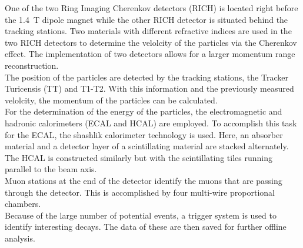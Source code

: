 One of the two Ring Imaging Cherenkov detectors (RICH) is located right before the \qty{1.4}{\tesla} dipole magnet while the other RICH detector is situated behind the tracking stations. Two materials with 
different refractive indices are used in the two RICH detectors to determine the velolcity of the particles via the Cherenkov effect. The implementation of two detectors allows for a larger momentum range 
reconstruction. \\
The position of the particles are detected by the tracking stations, the Tracker Turicensis (TT) and T1-T2. With this information and the previously measured velolcity, the momentum of the particles can
be calculated. \\
For the determination of the energy of the particles, the electromagnetic and hadronic calorimeters (ECAL and HCAL) are employed. To accomplish this task for the ECAL, the shashlik calorimeter 
technology is used. Here, an absorber material and a detector layer of a scintillating material are stacked alternately. The HCAL is constructed similarly but with the scintillating tiles running 
parallel to the beam axis. \\
Muon stations at the end of the detector identify the muons that are passing through the detector. This is accomplished by four multi-wire proportional chambers. \\
Because of the large number of potential events, a trigger system is used to identify interesting decays. The data of these are then saved for further offline analysis.

